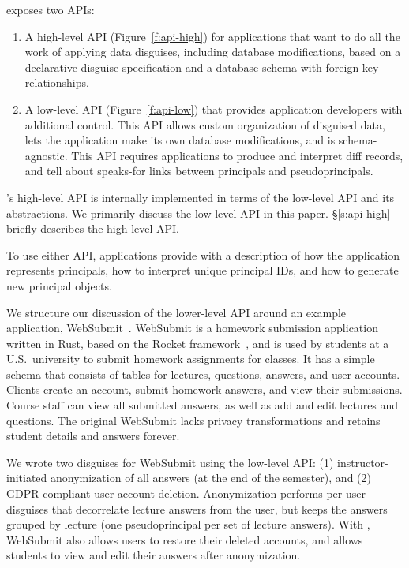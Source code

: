 \sys exposes two APIs:
\begin{enumerate}[nosep]
 \item A high-level API (Figure~\ref{f:api-high}) for applications that want \sys to do
   all the work of applying data disguises, including database modifications, based on
   a declarative disguise specification and a database schema with foreign key
   relationships.
 \item A low-level API (Figure~\ref{f:api-low}) that provides application developers with
   additional control. This API allows custom organization of disguised data, lets the application
   make its own database modifications, and is schema-agnostic. This API requires applications
   to produce and interpret diff records, and tell \sys about speaks-for links between
   principals and pseudoprincipals. 
\end{enumerate}
%
\sys's high-level API is internally implemented in terms of the low-level API and its
abstractions. We primarily discuss the low-level API in this paper.
%
\S\ref{s:api-high} briefly describes the high-level API.
%

%
To use either API, applications provide \sys with a description of how the application represents
principals, how to interpret unique principal IDs, and how to
generate new principal objects.
%

%
We structure our discussion of the lower-level API around an example application, WebSubmit~\cite{websubmit-rs-anon}.
%
WebSubmit is a homework submission application written in Rust, based on the Rocket
framework~\cite{rocket-rs}, and is used by students at a U.S.\ university to submit homework assignments for classes.
%
It has a simple schema that consists of tables for lectures, questions, answers,
and user accounts.
%
Clients create an account, submit homework answers, and view their submissions.
%
Course staff can view all submitted answers, as well as add and edit lectures and
questions.
%
The original WebSubmit lacks privacy transformations and retains student
details and answers forever.
%

%
We wrote two disguises for WebSubmit using the low-level API: (1) instructor-initiated anonymization
of all answers (\eg at the end of the semester), and (2) GDPR-compliant user account deletion.
%
Anonymization performs per-user disguises that decorrelate lecture answers from the user, but keeps
the answers grouped by lecture (\ie one pseudoprincipal per set of lecture answers).
%
With \sys, WebSubmit also allows users to restore their deleted accounts, and allows students to
view and edit their answers after anonymization.

